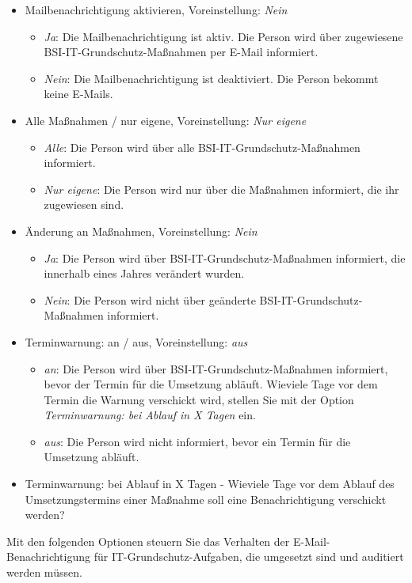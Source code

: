 \documentclass[a4paper,10pt]{book}
\begin{document}
\begin{itemize}
 \item Mailbenachrichtigung aktivieren, Voreinstellung: {\em Nein}
  \begin{itemize}
   \item {\em Ja}: Die Mailbenachrichtigung ist aktiv. Die Person wird über zugewiesene BSI-IT-Grundschutz-Maßnahmen per E-Mail informiert.
   \item {\em Nein}: Die Mailbenachrichtigung ist deaktiviert. Die Person bekommt keine E-Mails.
  \end{itemize}
 \item Alle Maßnahmen / nur eigene, Voreinstellung: {\em Nur eigene}
  \begin{itemize}
   \item {\em Alle}: Die Person wird über alle BSI-IT-Grundschutz-Maßnahmen informiert.
   \item {\em Nur eigene}: Die Person wird nur über die Maßnahmen informiert, die ihr zugewiesen sind.
  \end{itemize}
 \item Änderung an Maßnahmen, Voreinstellung: {\em Nein}
  \begin{itemize}
   \item {\em Ja}: Die Person wird über BSI-IT-Grundschutz-Maßnahmen informiert, die innerhalb eines Jahres verändert wurden.
   \item {\em Nein}: Die Person wird nicht über geänderte BSI-IT-Grundschutz-Maßnahmen informiert.
  \end{itemize}
 \item Terminwarnung: an / aus, Voreinstellung: {\em aus}
  \begin{itemize}
   \item {\em an}: Die Person wird über BSI-IT-Grundschutz-Maßnahmen informiert, bevor der Termin für die Umsetzung abläuft. Wieviele Tage vor dem Termin die Warnung verschickt wird, stellen Sie mit der Option {\em Terminwarnung: bei Ablauf in X Tagen} ein.
   \item {\em aus}: Die Person wird nicht informiert, bevor ein Termin für die Umsetzung abläuft.
  \end{itemize}
 \item Terminwarnung: bei Ablauf in X Tagen - Wieviele Tage vor dem Ablauf des Umsetzungstermins einer Maßnahme soll eine Benachrichtigung verschickt werden?
\end{itemize}
Mit den folgenden Optionen steuern Sie das Verhalten der E-Mail-Benachrichtigung für IT-Grundschutz-Aufgaben, die umgesetzt sind und auditiert werden müssen.
\end{document}
